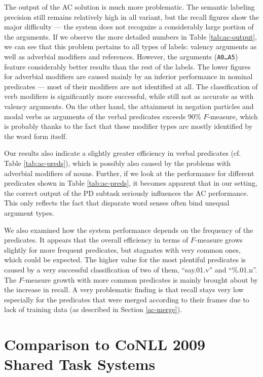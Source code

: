 \documentclass[12pt,notitlepage]{report}
\begin{document}
The output of the AC solution is much more problematic. The semantic labeling precision still remains relatively high in all variant, but the recall figures show the major difficulty --- the system does not recognize a considerably large portion of the arguments. If we observe the more detailed numbers in Table \ref{tab:ac-output}, we can see that this problem pertains to all types of labels: valency arguments as well as adverbial modifiers and references. However, the arguments (\texttt{A0\dots A5}) feature considerably better results than the rest of the labels. The lower figures for adverbial modifiers are caused mainly by an inferior performance in nominal predicates --- most of their modifiers are not identified at all. The classification of verb modifiers is significantly more successful, while still not as accurate as with valency arguments. On the other hand, the attainment in negation particles and modal verbs as arguments of the verbal predicates exceeds 90\% $F$-measure, which is probably thanks to the fact that these modifier types are mostly identified by the word form itself.

Our results also indicate a slightly greater efficiency in verbal predicates (cf. Table \ref{tab:ac-preds}), which is possibly also caused by the problems with adverbial modifiers of nouns. Further, if we look at the performance for different predicates shown in Table \ref{tab:ac-preds}, it becomes apparent that in our setting, the correct output of the PD subtask seriously influences the AC performance. This only reflects the fact that disparate word senses often bind unequal argument types.

We also examined how the system performance depends on the frequency of the predicates. It appears that the overall efficiency in terms of $F$-measure grows slightly for more frequent predicates, but stagnates with very common ones, which could be expected. The higher value for the most plentiful predicates is caused by a very successful classification of two of them, ``say.01.v'' and ``\%.01.n''. The $F$-measure growth with more common predicates is mainly brought about by the increase in recall. A very problematic finding is that recall stays very low especially for the predicates that were merged according to their frames due to lack of training data (as described in Section \ref{ac-merge}).

\section{Comparison to CoNLL 2009 Shared Task Systems}\label{comparison}
\end{document}
